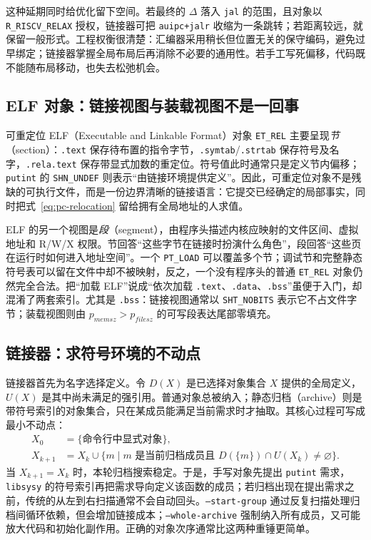 这种延期同时给优化留下空间。若最终的 \(\Delta\) 落入 \texttt{jal} 的范围，且对象以 \texttt{R\_RISCV\_RELAX} 授权，链接器可把 \texttt{auipc+jalr} 收缩为一条跳转；若距离较远，就保留一般形式\cite{bin-riscv-psabi-relax}。工程权衡很清楚：汇编器采用稍长但位置无关的保守编码，避免过早绑定；链接器掌握全局布局后再消除不必要的通用性。若手工写死偏移，代码既不能随布局移动，也失去松弛机会。

\subsection{ELF 对象：链接视图与装载视图不是一回事}

可重定位 ELF（Executable and Linkable Format）对象 \texttt{ET\_REL} 主要呈现\emph{节}（section）：\texttt{.text} 保存待布置的指令字节，\texttt{.symtab}/\texttt{.strtab} 保存符号及名字，\texttt{.rela.text} 保存带显式加数的重定位。符号值此时通常只是定义节内偏移；\texttt{putint} 的 \texttt{SHN\_UNDEF} 则表示“由链接环境提供定义”。因此，可重定位对象不是残缺的可执行文件，而是一份边界清晰的链接语言：它提交已经确定的局部事实，同时把式~\eqref{eq:pc-relocation} 留给拥有全局地址的人求值\cite{bin-sysv-gabi}。

ELF 的另一个视图是\emph{段}（segment），由程序头描述内核应映射的文件区间、虚拟地址和 R/W/X 权限。节回答“这些字节在链接时扮演什么角色”，段回答“这些页在运行时如何进入地址空间”。一个 \texttt{PT\_LOAD} 可以覆盖多个节；调试节和完整静态符号表可以留在文件中却不被映射，反之，一个没有程序头的普通 \texttt{ET\_REL} 对象仍然完全合法。把“加载 ELF”说成“依次加载 \texttt{.text}、\texttt{.data}、\texttt{.bss}”虽便于入门，却混淆了两套索引。尤其是 \texttt{.bss}：链接视图通常以 \texttt{SHT\_NOBITS} 表示它不占文件字节；装载视图则由 \(p_{memsz}>p_{filesz}\) 的可写段表达尾部零填充。

\subsection{链接器：求符号环境的不动点}

链接器首先为名字选择定义。令 \(D(X)\) 是已选择对象集合 \(X\) 提供的全局定义，\(U(X)\) 是其中尚未满足的强引用。普通对象总被纳入；静态归档（archive）则是带符号索引的对象集合，只在某成员能满足当前需求时才抽取。其核心过程可写成最小不动点：
\begin{align*}
  X_0 &= \{\text{命令行中显式对象}\},\\
  X_{k+1} &= X_k\cup
  \{m\mid m\text{ 是当前归档成员且 }D(\{m\})\cap U(X_k)\ne\varnothing\}.
\end{align*}
当 \(X_{k+1}=X_k\) 时，本轮归档搜索稳定。于是，手写对象先提出 \texttt{putint} 需求，\texttt{libsysy} 的符号索引再把需求导向定义该函数的成员；若归档出现在提出需求之前，传统的从左到右扫描通常不会自动回头\cite{bin-gnu-ar,bin-gnu-ld}。\texttt{--start-group} 通过反复扫描处理归档间循环依赖，但会增加链接成本；\texttt{--whole-archive} 强制纳入所有成员，又可能放大代码和初始化副作用。正确的对象次序通常比这两种重锤更简单。

